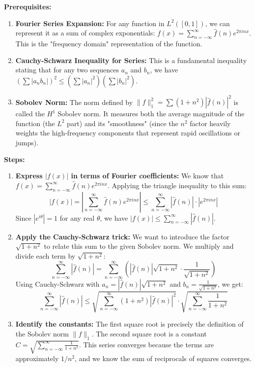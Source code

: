 \begin{solution}
\textbf{Prerequisites:}
\begin{enumerate}
    \item \textbf{Fourier Series Expansion:} For any function in $L^2([0,1])$, we can represent it as a sum of complex exponentials: $f(x) = \sum_{n=-\infty}^\infty \hat{f}(n) e^{2\pi i n x}$. This is the "frequency domain" representation of the function.
    \item \textbf{Cauchy-Schwarz Inequality for Series:} This is a fundamental inequality stating that for any two sequences $a_n$ and $b_n$, we have $\left(\sum |a_n b_n|\right)^2 \leq \left(\sum |a_n|^2\right) \left(\sum |b_n|^2\right)$. 
    \item \textbf{Sobolev Norm:} The norm defined by $\|f\|_1^2 = \sum (1+n^2)|\hat{f}(n)|^2$ is called the $H^1$ Sobolev norm. It measures both the average magnitude of the function (the $L^2$ part) and its "smoothness" (since the $n^2$ factor heavily weights the high-frequency components that represent rapid oscillations or jumps).
\end{enumerate}

\textbf{Steps:}
\begin{enumerate}
    \item \textbf{Express $|f(x)|$ in terms of Fourier coefficients:} 
    We know that $f(x) = \sum_{n=-\infty}^\infty \hat{f}(n) e^{2\pi i n x}$. Applying the triangle inequality to this sum:
    \[ |f(x)| = \left| \sum_{n=-\infty}^\infty \hat{f}(n) e^{2\pi i n x} \right| \leq \sum_{n=-\infty}^\infty |\hat{f}(n)| \cdot |e^{2\pi i n x}| \]
    Since $|e^{i\theta}| = 1$ for any real $\theta$, we have $|f(x)| \leq \sum_{n=-\infty}^\infty |\hat{f}(n)|$.

    \item \textbf{Apply the Cauchy-Schwarz trick:} We want to introduce the factor $\sqrt{1+n^2}$ to relate this sum to the given Sobolev norm. We multiply and divide each term by $\sqrt{1+n^2}$:
    \[ \sum_{n=-\infty}^\infty |\hat{f}(n)| = \sum_{n=-\infty}^\infty \left( |\hat{f}(n)| \sqrt{1+n^2} \cdot \frac{1}{\sqrt{1+n^2}} \right) \]
    Using Cauchy-Schwarz with $a_n = |\hat{f}(n)| \sqrt{1+n^2}$ and $b_n = \frac{1}{\sqrt{1+n^2}}$, we get:
    \[ \sum_{n=-\infty}^\infty |\hat{f}(n)| \leq \sqrt{\sum_{n=-\infty}^\infty (1+n^2)|\hat{f}(n)|^2} \cdot \sqrt{\sum_{n=-\infty}^\infty \frac{1}{1+n^2}} \]

    \item \textbf{Identify the constants:}
    The first square root is precisely the definition of the Sobolev norm $\|f\|_1$. 
    The second square root is a constant $C = \sqrt{\sum_{n=-\infty}^\infty \frac{1}{1+n^2}}$. This series converges because the terms are approximately $1/n^2$, and we know the sum of reciprocals of squares converges.


\end{enumerate}
\end{solution}
